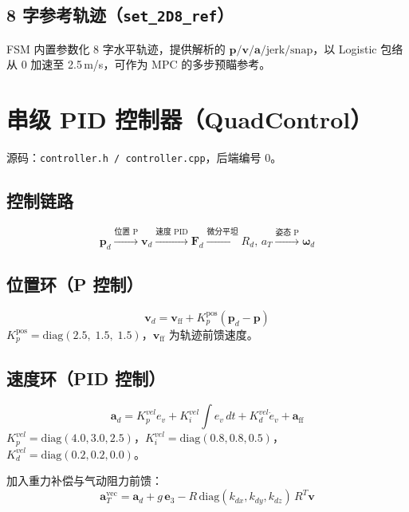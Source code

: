 \documentclass[UTF8, a4paper, 11pt]{ctexart}
\newcommand{\bp}{\mathbf{p}}
\newcommand{\bv}{\mathbf{v}}
\newcommand{\bw}{\boldsymbol{\omega}}
\newcommand{\diag}{\mathrm{diag}}
\begin{document}
\subsection{8 字参考轨迹（\texttt{set\_2D8\_ref}）}

FSM 内置参数化 8 字水平轨迹，提供解析的 $\bp/\bv/\mathbf{a}/\text{jerk}/\text{snap}$，以 Logistic 包络从 0 加速至 2.5\,m/s，可作为 MPC 的多步预瞄参考。

\section{串级 PID 控制器（QuadControl）}

源码：\texttt{controller.h / controller.cpp}，后端编号 0。

\subsection{控制链路}

\[
  \bp_d \xrightarrow{\text{位置 P}} \bv_d \xrightarrow{\text{速度 PID}} \mathbf{F}_d \xrightarrow{\text{微分平坦}} R_d,\,a_T \xrightarrow{\text{姿态 P}} \bw_d
\]

\subsection{位置环（P 控制）}

\begin{equation}
  \bv_d = \bv_{\text{ff}} + K_p^{\text{pos}}\!\left(\bp_d - \bp\right)
\end{equation}
$K_p^{\text{pos}} = \diag(2.5,\;1.5,\;1.5)$，$\bv_{\text{ff}}$ 为轨迹前馈速度。

\subsection{速度环（PID 控制）}

\begin{equation}
  \mathbf{a}_d = K_p^{vel}e_v + K_i^{vel}\!\int e_v\,dt + K_d^{vel}\dot{e}_v + \mathbf{a}_{\text{ff}}
\end{equation}
$K_p^{vel}=\diag(4.0,3.0,2.5)$，$K_i^{vel}=\diag(0.8,0.8,0.5)$，$K_d^{vel}=\diag(0.2,0.2,0.0)$。

加入重力补偿与气动阻力前馈：
\begin{equation}
  \mathbf{a}_T^{\text{vec}} = \mathbf{a}_d + g\,\mathbf{e}_3 - R\,\diag(k_{dx},k_{dy},k_{dz})\,R^T\bv
\end{equation}
\end{document}
